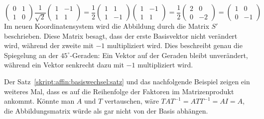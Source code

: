 \begin{beispiel}
\[\begin{pmatrix}
0&1\\1&0
\end{pmatrix}
\frac1{\sqrt{2}}\begin{pmatrix}
1&-1\\
1&1
\end{pmatrix}
=
\frac12
\begin{pmatrix}
1&1\\1&-1
\end{pmatrix}
\begin{pmatrix}
1&-1\\1&1
\end{pmatrix}
=
\frac12
\begin{pmatrix}
2&0\\0&-2
\end{pmatrix}
=
\begin{pmatrix}
1&0\\0&-1
\end{pmatrix}
\]
Im neuen Koordinatensystem wird die Abbildung durch die Matrix $S'$
beschrieben.
Diese Matrix besagt, dass der erste Basisvektor nicht verändert wird,
während der zweite mit $-1$ multipliziert wird.
Dies beschreibt genau die Spiegelung an der $45^\circ$-Geraden:
Ein Vektor auf der Geraden bleibt unverändert, während ein Vektor
senkrecht dazu mit $-1$ multipliziert wird.
\end{beispiel}

Der Satz~\ref{skript:affin:basiswechsel:satz} und das nachfolgende 
Beispiel zeigen ein weiteres Mal, dass es auf die Reihenfolge der
Faktoren im Matrizenprodukt ankommt.
Könnte man $A$ und $T$ vertauschen, wäre $TAT^{-1}=ATT^{-1}=AI=A$,
die Abbildungsmatrix würde als gar nicht von der Basis abhängen.

